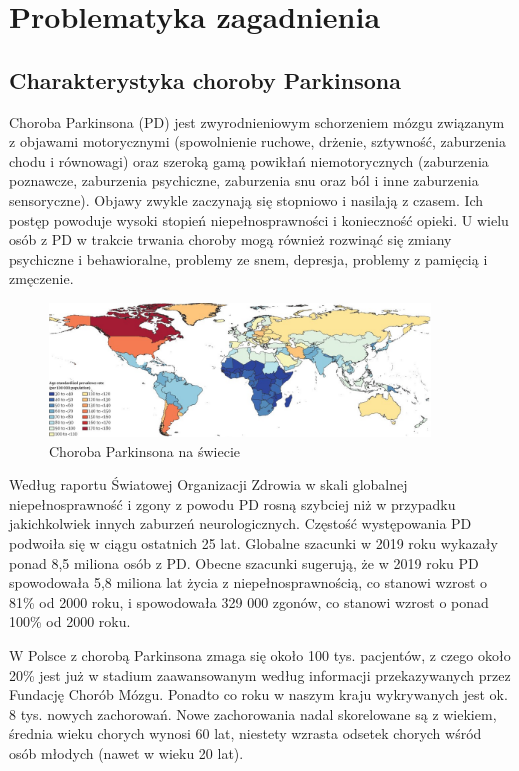 \chapter{Problematyka zagadnienia}
\label{ch:problematyka}

\section{Charakterystyka choroby Parkinsona}
\label{sec:charakterystykaPD}

Choroba Parkinsona (PD) jest zwyrodnieniowym schorzeniem mózgu związanym z objawami motorycznymi (spowolnienie ruchowe,
drżenie, sztywność, zaburzenia chodu i równowagi) oraz szeroką gamą powikłań niemotorycznych (zaburzenia poznawcze,
zaburzenia psychiczne, zaburzenia snu oraz ból i inne zaburzenia sensoryczne).
Objawy zwykle zaczynają się stopniowo i nasilają z czasem.
Ich postęp powoduje wysoki stopień niepełnosprawności i konieczność opieki.
U wielu osób z PD w trakcie trwania choroby mogą również rozwinąć się zmiany psychiczne i behawioralne, problemy ze snem,
depresja, problemy z pamięcią i zmęczenie.

\begin{figure}[htbp]
	\centering
	\includegraphics[width=0.9\textwidth]{./img/map}
	\caption{Choroba Parkinsona na świecie \cite{global_PD}}
    \label{fig:PD_map}
\end{figure}

Według raportu Światowej Organizacji Zdrowia\cite{WHO} w skali globalnej niepełnosprawność i zgony z powodu PD
rosną szybciej niż w przypadku jakichkolwiek innych zaburzeń neurologicznych.
Częstość występowania PD podwoiła się w ciągu ostatnich 25 lat.
Globalne szacunki w 2019 roku wykazały ponad 8,5 miliona osób z PD.
Obecne szacunki sugerują, że w 2019 roku PD spowodowała 5,8 miliona lat życia z niepełnosprawnością, co
stanowi wzrost o 81\% od 2000 roku, i spowodowała 329 000 zgonów, co stanowi wzrost o ponad 100\% od 2000 roku.

W Polsce z chorobą Parkinsona zmaga się około 100 tys. pacjentów, z czego około 20\% jest już w stadium zaawansowanym
według informacji przekazywanych przez Fundację Chorób Mózgu.
Ponadto co roku w naszym kraju wykrywanych jest ok. 8 tys. nowych zachorowań.
Nowe zachorowania nadal skorelowane są z wiekiem, średnia wieku chorych wynosi 60 lat, niestety wzrasta odsetek chorych wśród osób młodych (nawet w wieku 20 lat).

